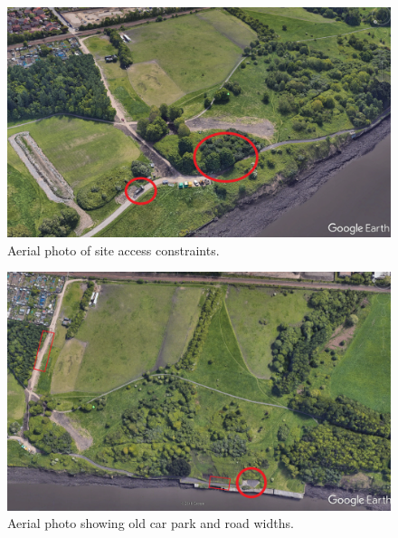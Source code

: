 \documentclass[12pt, a4paper]{article}
\begin{document}
\begin{figure}[H]
  \centering
  	\includegraphics[width=0.5\textheight]{wall2}
   	\caption{Aerial photo of site access constraints.}
	\label{wall2}
\end{figure}

\begin{figure}[H]
  \centering
  	\includegraphics[width=0.5\textheight]{wall3}
   	\caption{Aerial photo showing old car park and road widths.}
	\label{wall3}
\end{figure}
\end{document}
